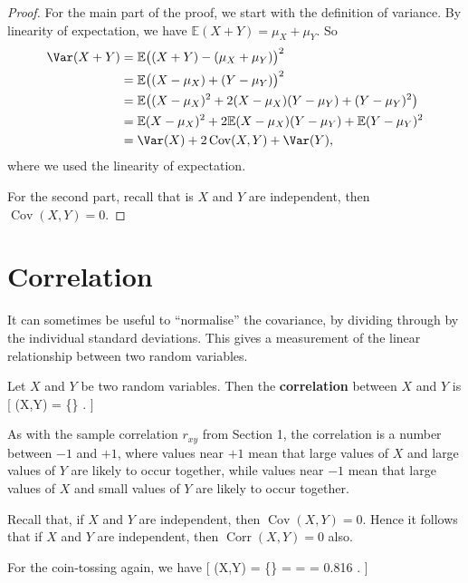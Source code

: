 \documentclass[
  letterpaper,
]{report}
\theoremstyle{definition}
\theoremstyle{definition}
\theoremstyle{remark}
\begin{document}
\begin{proof}

For the main part of the proof, we start with the definition of
variance. By linearity of expectation, we have
\(\mathbb E(X + Y) = \mu_X + \mu_Y\). So \begin{align*}
\Var(X + Y) &= \mathbb E\big((X + Y) - (\mu_X + \mu_Y)\big)^2 \\
  &= \mathbb E \big((X - \mu_X) + (Y - \mu_Y) \big)^2 \\
  &= \mathbb E \big( (X - \mu_X)^2 + 2(X - \mu_X)(Y - \mu_Y) + (Y - \mu_Y)^2\big) \\
  &= \mathbb E(X - \mu_X)^2 + 2 \mathbb E(X - \mu_X)(Y - \mu_Y) + \mathbb E (Y - \mu_Y)^2 \\
  &= \Var(X) + 2\operatorname{Cov}(X,Y) + \Var(Y) ,
\end{align*} where we used the linearity of expectation.

For the second part, recall that is \(X\) and \(Y\) are independent,
then \(\operatorname{Cov}(X,Y) = 0\).

\end{proof}

\hypertarget{correlation}{%
\section{Correlation}\label{correlation}}

It can sometimes be useful to ``normalise'' the covariance, by dividing
through by the individual standard deviations. This gives a measurement
of the linear relationship between two random variables.

Let \(X\) and \(Y\) be two random variables. Then the
\textbf{correlation} between \(X\) and \(Y\) is {[}
(X,Y) = 
\{\} . {]}

As with the sample correlation \(r_{xy}\) from Section 1, the
correlation is a number between \(-1\) and \(+1\), where values near
\(+1\) mean that large values of \(X\) and large values of \(Y\) are
likely to occur together, while values near \(-1\) mean that large
values of \(X\) and small values of \(Y\) are likely to occur together.

Recall that, if \(X\) and \(Y\) are independent, then
\(\operatorname{Cov}(X,Y) = 0\). Hence it follows that if \(X\) and
\(Y\) are independent, then \(\operatorname{Corr}(X,Y) = 0\) also.

For the coin-tossing again, we have {[} (X,Y) =
 \{\} =
 =  = 0.816
. {]}
\end{document}
